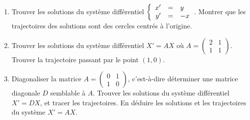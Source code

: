\documentclass[12pt, class=report,crop=false]{standalone}
\begin{document}
 
 
\begin{miniexercices}
\sauteligne
\begin{enumerate}
  \item Trouver les solutions du système différentiel 
    $\left\{\begin{array}{rcl}x'&=&y\cr y'&=&-x\end{array}\right.$. 
    Montrer que les trajectoires des solutions sont des cercles centrés à l'origine.
    
  \item Trouver les solutions du système différentiel $X'=AX$ où
  $A =  \left(\begin{smallmatrix}2&1\\1&1\end{smallmatrix} \right)$.
  Trouver la trajectoire passant par le point $(1,0)$.
  
  \item Diagonaliser la matrice $A =  \left(\begin{smallmatrix}0&1\\1&0\end{smallmatrix} \right)$,
  c'est-à-dire déterminer une matrice diagonale $D$ semblable à $A$.   
  Trouver les solutions du système différentiel $X'=DX$, et tracer les trajectoires.
  En déduire les solutions et les trajectoires du système $X'=AX$.
  
\end{enumerate}
\end{miniexercices}







\finchapitre 
\end{document}
